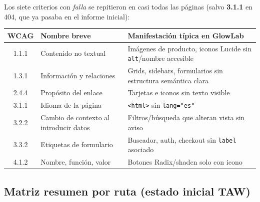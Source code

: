 \documentclass[11pt,a4paper]{article}
\begin{document}
Los siete criterios con \emph{falla} se repitieron en casi todas las páginas (salvo \textbf{3.1.1} en 404, que ya pasaba en el informe inicial):

\begin{center}
\small
\begin{tabular}{@{}clp{7.5cm}@{}}
\toprule
\textbf{WCAG} & \textbf{Nombre breve} & \textbf{Manifestación típica en GlowLab} \\
\midrule
1.1.1 & Contenido no textual & Imágenes de producto, iconos Lucide sin \texttt{alt}/nombre accesible \\
1.3.1 & Información y relaciones & Grids, sidebars, formularios sin estructura semántica clara \\
2.4.4 & Propósito del enlace & Tarjetas e iconos sin texto visible \\
3.1.1 & Idioma de la página & \texttt{<html>} sin \texttt{lang="es"} \\
3.2.2 & Cambio de contexto al introducir datos & Filtros/búsqueda que alteran vista sin aviso \\
3.3.2 & Etiquetas de formulario & Buscador, auth, checkout sin \texttt{label} asociado \\
4.1.2 & Nombre, función, valor & Botones Radix/shadcn solo con icono \\
\bottomrule
\end{tabular}
\end{center}

\subsection{Matriz resumen por ruta (estado inicial TAW)}
\end{document}
